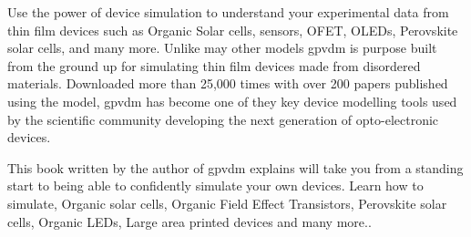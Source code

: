\newpage
\titleformat{\chapter}{}{}{0em}{\bf\LARGE}

\color{white}


Use the power of device simulation to understand your experimental data from thin film devices such as Organic Solar cells, sensors, OFET, OLEDs, Perovskite solar cells, and many more. Unlike may other models gpvdm is purpose built from the ground up for simulating thin film devices made from disordered materials. Downloaded more than 25,000 times with over 200 papers published using the model, gpvdm has become one of they key device modelling tools used by the scientific community developing the next generation of opto-electronic devices.

This book written by the author of gpvdm explains will take you from a standing start to being able to confidently simulate your own devices. Learn how to simulate, Organic solar cells, Organic Field Effect Transistors, Perovskite solar cells, Organic LEDs, Large area printed devices
 and many more..

\addtolength{\wpXoffset}{-22cm}
\addtolength{\wpYoffset}{0cm}


